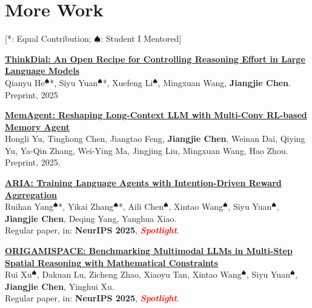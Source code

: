 \documentclass{resume}
\begin{document}
\section{More Work}

[*: Equal Contribution; $\spadesuit$: Student I Mentored]

\begin{enumerate}[label={[\arabic*]}]
\setlength{\itemsep}{3pt}
\setcounter{enumi}{9}

  \item \textbf{\href{https://arxiv.org/pdf/2508.18773}{ThinkDial: An Open Recipe for Controlling Reasoning Effort in Large Language Models}}\\
  \label{paper:thinkdial}
  Qianyu He$^\spadesuit$*, Siyu Yuan$^\spadesuit$*, Xuefeng Li$^\spadesuit$, Mingxuan Wang, \textbf{Jiangjie Chen}.\\
  Preprint, 2025


  \item \textbf{\href{https://memagent-sialab.github.io}{MemAgent: Reshaping Long-Context LLM with Multi-Conv RL-based Memory Agent}}\\
  \label{paper:memagent}
  Hongli Yu, Tinghong Chen, Jiangtao Feng, \textbf{Jiangjie Chen}, Weinan Dai, Qiying Yu, Ya-Qin Zhang, Wei-Ying Ma, Jingjing Liu, Mingxuan Wang, Hao Zhou.\\
  Preprint, 2025.
  
  \item \textbf{\href{https://jiangjiechen.github.io/publication/aria}{ARIA: Training Language Agents with Intention-Driven Reward Aggregation}}\\
  \label{paper:aria}
  Ruihan Yang$^\spadesuit$*, Yikai Zhang$^\spadesuit$*, Aili Chen$^\spadesuit$, Xintao Wang$^\spadesuit$, Siyu Yuan$^\spadesuit$, \textbf{Jiangjie Chen}, Deqing Yang, Yanghua Xiao.\\
  Regular paper, in: \textbf{NeurIPS 2025}, \textcolor{red}{\textbf{\textit{Spotlight}}}.

  \item \textbf{\href{https://openreview.net/forum?id=y7ahj9RoXQ}{ORIGAMISPACE: Benchmarking Multimodal LLMs in Multi-Step Spatial Reasoning with Mathematical Constraints}}\\
  \label{paper:ORIGAMISPACE}
  Rui Xu$^\spadesuit$, Dakuan Lu, Zicheng Zhao, Xiaoyu Tan, Xintao Wang$^\spadesuit$, Siyu Yuan$^\spadesuit$, \textbf{Jiangjie Chen}, Yinghui Xu.\\
  Regular paper, in: \textbf{NeurIPS 2025}, \textcolor{red}{\textbf{\textit{Spotlight}}}.



\end{enumerate}
\end{document}
